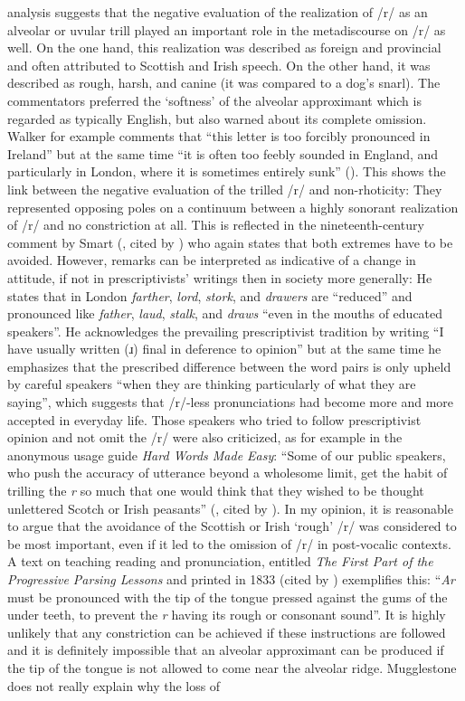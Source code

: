  analysis suggests that the negative evaluation of the realization of /r/ as an alveolar or uvular trill played an important role in the metadiscourse on /r/ as well. On the one hand, this realization was described as foreign and provincial and often attributed to Scottish and Irish speech. On the other hand, it was described as rough, harsh, and canine (it was compared to a dog’s snarl). The commentators preferred the ‘softness’ of the alveolar approximant which is regarded as typically English, but also warned about its complete omission. Walker for example comments that “this letter is too forcibly pronounced in Ireland” but at the same time “it is often too feebly sounded in England, and particularly in London, where it is sometimes entirely sunk” (\citeyear[50]{Walker1791}). This shows the link between the negative evaluation of the trilled /r/ and non-rhoticity: They represented opposing poles on a continuum between a highly sonorant realization of /r/ and no constriction at all. This is reflected in the nineteenth-century comment by Smart (\citeyear[33]{Smart1836}, cited by \citealt[339]{Jones2006}) who again states that both extremes have to be avoided. However,  remarks can be interpreted as indicative of a change in attitude, if not in prescriptivists’ writings then in society more generally: He states that in London \emph{farther}, \emph{lord}, \emph{stork}, and \emph{drawers} are “reduced” and pronounced like \emph{father}, \emph{laud}, \emph{stalk}, and \emph{draws} “even in the mouths of educated speakers”. He acknowledges the prevailing prescriptivist tradition by writing “I have usually written (ɹ) final in deference to opinion” but at the same time he emphasizes that the prescribed difference between the word pairs is only upheld by careful speakers “when they are thinking particularly of what they are saying”, which suggests that /r/-less pronunciations had become more and more accepted in everyday life. Those speakers who tried to follow prescriptivist opinion and not omit the /r/ were also criticized, as for example in the anonymous usage guide \emph{Hard Words Made Easy}: “Some of our public speakers, who push the accuracy of utterance beyond a wholesome limit, get the habit of trilling the \emph{r} so much that one would think that they wished to be thought unlettered Scotch or Irish peasants” (\citealt[4]{Anon1855}, cited by \citealt[90]{Mugglestone2003}). In my opinion, it is reasonable to argue that the avoidance of the Scottish or Irish ‘rough’ /r/ was considered to be most important, even if it led to the omission of /r/ in post-vocalic contexts. A text on teaching reading and pronunciation, entitled \emph{The First Part of the Progressive Parsing Lessons} and printed in 1833 (cited by \citealt[248]{Mugglestone2003}) exemplifies this: “\emph{Ar} must be pronounced with the tip of the tongue pressed against the gums of the under teeth, to prevent the \emph{r} having its rough or consonant sound”. It is highly unlikely that any constriction can be achieved if these instructions are followed and it is definitely impossible that an alveolar approximant can be produced if the tip of the tongue is not allowed to come near the alveolar ridge. Mugglestone does not really explain why the loss of 